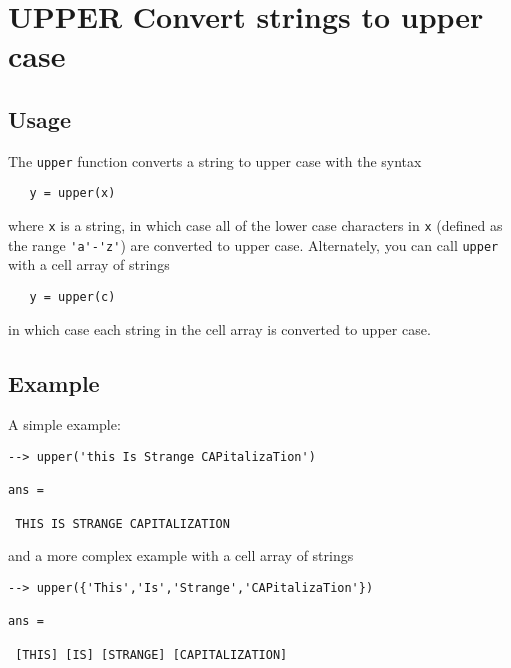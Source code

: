 \section{UPPER Convert strings to upper case}

\subsection{Usage}

The \verb|upper| function converts a string to upper case with
the syntax
\begin{verbatim}
   y = upper(x)
\end{verbatim}
where \verb|x| is a string, in which case all of the lower case
characters in \verb|x| (defined as the range \verb|'a'-'z'|) are
converted to upper case.  Alternately, you can call \verb|upper|
with a cell array of strings
\begin{verbatim}
   y = upper(c)
\end{verbatim}
in which case each string in the cell array is converted to upper case.
\subsection{Example}

A simple example:
\begin{verbatim}
--> upper('this Is Strange CAPitalizaTion')

ans = 

 THIS IS STRANGE CAPITALIZATION
\end{verbatim}
and a more complex example with a cell array of strings
\begin{verbatim}
--> upper({'This','Is','Strange','CAPitalizaTion'})

ans = 

 [THIS] [IS] [STRANGE] [CAPITALIZATION] 
\end{verbatim}
